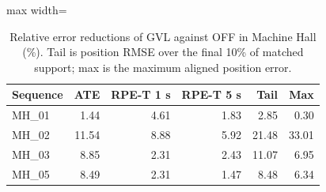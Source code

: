 \begin{table}[tb]
\caption{Relative error reductions of GVL against OFF in Machine Hall (\%). Tail is position RMSE over the final 10\% of matched support; max is the maximum aligned position error.}\label{tab:mhmetrics}
\centering\small
\begin{adjustbox}{max width=\columnwidth}
\begin{tabular}{lrrrrr}
\toprule
Sequence & ATE & RPE-T 1 s & RPE-T 5 s & Tail & Max \\
\midrule
MH\_01 & 1.44 & 4.61 & 1.83 & 2.85 & 0.30 \\
MH\_02 & 11.54 & 8.88 & 5.92 & 21.48 & 33.01 \\
MH\_03 & 8.85 & 2.31 & 2.43 & 11.07 & 6.95 \\
MH\_05 & 8.49 & 2.31 & 1.47 & 8.48 & 6.34 \\
\bottomrule
\end{tabular}
\end{adjustbox}
\end{table}
